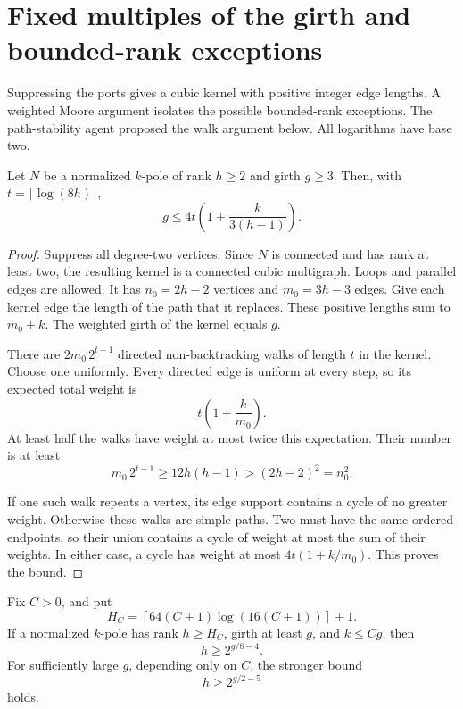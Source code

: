 \section{Fixed multiples of the girth and bounded-rank exceptions}
\label{sec:four-high-connectivity-weighted-kernel}

Suppressing the ports gives a cubic kernel with positive integer edge lengths.
A weighted Moore argument isolates the possible bounded-rank exceptions.
The path-stability agent proposed the walk argument below.
All logarithms have base two.

\begin{lemma}
\label{lem:four-weighted-kernel-moore}
Let $N$ be a normalized $k$-pole of rank $h\ge2$ and girth $g\ge3$.
Then, with $t=\lceil\log(8h)\rceil$,
\[
 g\le4t\left(1+\frac{k}{3(h-1)}\right).
\]
\end{lemma}

\begin{proof}
Suppress all degree-two vertices.
Since $N$ is connected and has rank at least two, the resulting kernel is a connected cubic multigraph.
Loops and parallel edges are allowed.
It has $n_0=2h-2$ vertices and $m_0=3h-3$ edges.
Give each kernel edge the length of the path that it replaces.
These positive lengths sum to $m_0+k$.
The weighted girth of the kernel equals $g$.

There are $2m_0\,2^{t-1}$ directed non-backtracking walks of length $t$ in the kernel.
Choose one uniformly.
Every directed edge is uniform at every step, so its expected total weight is
\[
 t\left(1+\frac{k}{m_0}\right).
\]
At least half the walks have weight at most twice this expectation.
Their number is at least
\[
 m_0\,2^{t-1}\ge12h(h-1)>(2h-2)^2=n_0^2.
\]

If one such walk repeats a vertex, its edge support contains a cycle of no greater weight.
Otherwise these walks are simple paths.
Two must have the same ordered endpoints, so their union contains a cycle of weight at most the sum of their weights.
In either case, a cycle has weight at most $4t(1+k/m_0)$.
This proves the bound.
\end{proof}

\begin{proposition}
\label{prop:four-fixed-ratio-shore-rank}
Fix $C>0$, and put
\[
 H_C=\left\lceil64(C+1)\log(16(C+1))\right\rceil+1.
\]
If a normalized $k$-pole has rank $h\ge H_C$, girth at least $g$, and $k\le Cg$, then
\[
 h\ge2^{g/8-4}.
\]
For sufficiently large $g$, depending only on $C$, the stronger bound
\[
 h\ge2^{g/2-5}
\]
holds.
\end{proposition}

